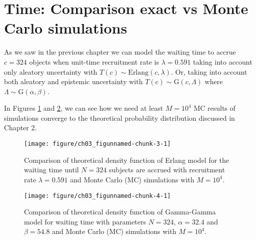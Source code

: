 \section{Time: Comparison exact vs Monte Carlo simulations}


As we saw in the previous chapter we can model the waiting time to accrue $c = 324$ objects when unit-time recruitment rate is $\lambda = 0.591$ taking into account only aleatory uncertainty with $T(c)\sim \textrm{Erlang}(c,\lambda)$. Or, taking into account both aleatory and epistemic uncertainty with $T(c)\sim\textrm{G}(c, \Lambda)$ where $\Lambda\sim \textrm{G}(\alpha,\beta)$.


In Figures \ref{fig:3_3} and \ref{fig:3_4}, we can see how we need at least $M=10^4$ MC results of simulations converge to the theoretical probability distribution discussed in Chapter 2.

% 
% 

\begin{figure}
\begin{knitrout}
\color{fgcolor}
\texttt{[image: figure/ch03\_figunnamed-chunk-3-1]} 
\end{knitrout}
\caption{Comparison of theoretical density function of Erlang model for the waiting time until $N = 324$ subjects are accrued with recruitment rate $\lambda = 0.591$ and Monte Carlo (MC) simulations with $M=10^4$.}
\label{fig:3_3}
\end{figure}


\begin{figure}
\begin{knitrout}
\color{fgcolor}
\texttt{[image: figure/ch03\_figunnamed-chunk-4-1]} 
\end{knitrout}
\caption{Comparison of theoretical density function of Gamma-Gamma model for waiting time with parameters $N=324$, $\alpha = 32.4$ and $\beta = 54.8$ and Monte Carlo (MC) simulations with $M=10^4$.}
\label{fig:3_4}
\end{figure}







